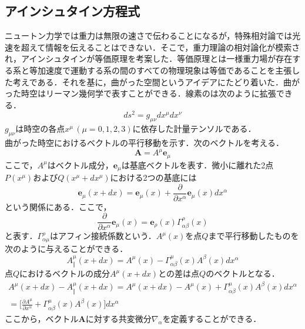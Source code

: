 \subsection{アインシュタイン方程式}
ニュートン力学では重力は無限の速さで伝わることになるが，特殊相対論では光速を超えて情報を伝えることはできない．そこで，重力理論の相対論化が模索され，アインシュタインが等価原理を考案した．等価原理とは一様重力場が存在する系と等加速度で運動する系の間のすべての物理現象は等価であることを主張した考えである．それを基に，曲がった空間というアイデアにたどり着いた．曲がった時空はリーマン幾何学で表すことができる．線素のは次のように拡張できる．
\begin{dmath}
    ds^2=g_{\mu\nu}dx^\mu dx^\nu
\end{dmath}
$g_{\mu\nu}$は時空の各点$x^\mu\,(\mu=0,1,2,3)$に依存した計量テンソルである．
\\曲がった時空におけるベクトルの平行移動を示す．次のベクトルを考える．
\begin{dmath}
    \mathbf{A}=A^\mu\mathbf{e}_\mu
\end{dmath}
ここで，$A^\mu$はベクトル成分，$\mathbf{e}_\mu$は基底ベクトルを表す．微小に離れた2点$P(x^\mu)$および$Q(x^\mu+dx^\mu)$における2つの基底には
\begin{dmath}
    \mathbf{e}_\mu (x+dx)=\mathbf{e}_\mu(x)+\frac{\partial}{\partial x^\alpha}\mathbf{e}_\mu(x)dx^\alpha
\end{dmath}
という関係にある．ここで，
\begin{dmath}
    \frac{\partial}{\partial x^\alpha}\mathbf{e}_\mu(x)=\mathbf{e}_\rho(x)\Gamma^\rho_{\alpha\beta}(x)
\end{dmath}
と表す．$\Gamma^\rho_{\alpha\mu}$はアフィン接続係数という．$A^\mu(x)$を点$Q$まで平行移動したものを次のように与えることができる．
\begin{dmath}
    A^\mu_\Vert(x+dx)=A^\mu(x)-\Gamma^\mu_{\alpha\beta}(x)A^\beta(x)dx^\alpha
\end{dmath}
点$Q$におけるベクトルの成分$A^\mu(x+dx)$との差は点$Q$のベクトルとなる．
\begin{dmath}
    \begin{aligned}
    A^\mu(x+dx)-A^\mu_\Vert(x+dx)=A^\mu(x+dx)-A^\mu(x)+\Gamma^\mu_{\alpha\beta}(x)A^\beta(x)dx^\alpha
    \\=\bigg[\frac{\partial A^\mu}{\partial x^\alpha}+\Gamma^\mu_{\alpha\beta}(x)A^\beta(x)\bigg]dx^\alpha
    \end{aligned}
\end{dmath}
ここから，ベクトル$\mathbf{A}$に対する共変微分$\nabla_\alpha$を定義することができる．

